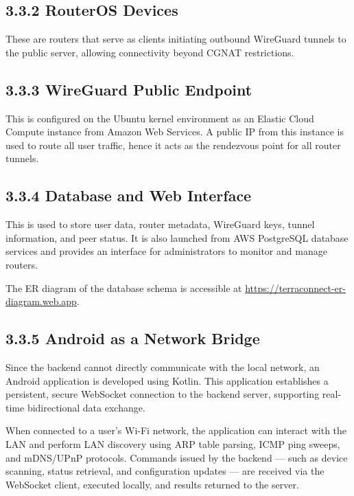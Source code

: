 \documentclass[12pt,a4paper,oneside]{report}
\begin{document}
\subsection{3.3.2 RouterOS Devices}

These are routers that serve as clients initiating outbound WireGuard tunnels to the public server, allowing connectivity beyond CGNAT restrictions.

\subsection{3.3.3 WireGuard Public Endpoint}

This is configured on the Ubuntu kernel environment as an Elastic Cloud Compute instance from Amazon Web Services. A public IP from this instance is used to route all user traffic, hence it acts as the rendezvous point for all router tunnels.

\subsection{3.3.4 Database and Web Interface}

This is used to store user data, router metadata, WireGuard keys, tunnel information, and peer status. It is also launched from AWS PostgreSQL database services and provides an interface for administrators to monitor and manage routers.

The ER diagram of the database schema is accessible at \href{https://terraconnect-er-diagram.web.app}{https://terraconnect-er-diagram.web.app}.

\subsection{3.3.5 Android as a Network Bridge}

Since the backend cannot directly communicate with the local network, an Android application is developed using Kotlin. This application establishes a persistent, secure WebSocket connection to the backend server, supporting real-time bidirectional data exchange.

When connected to a user's Wi-Fi network, the application can interact with the LAN and perform LAN discovery using ARP table parsing, ICMP ping sweeps, and mDNS/UPnP protocols. Commands issued by the backend --- such as device scanning, status retrieval, and configuration updates --- are received via the WebSocket client, executed locally, and results returned to the server.
\end{document}
